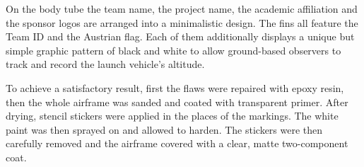 On the body tube the team name, the project name, the academic affiliation and the sponsor logos are arranged into a minimalistic design. The fins all feature the Team ID and the Austrian flag. Each of them additionally displays a unique but simple graphic pattern of black and white to allow ground-based observers to track and record the launch vehicle’s altitude.

To achieve a satisfactory result, first the flaws were repaired with epoxy resin, then the whole airframe was sanded and coated with transparent primer. After drying, stencil stickers were applied in the places of the markings. The white paint was then sprayed on and allowed to harden. The stickers were then carefully removed and the airframe covered with a clear, matte two-component coat.